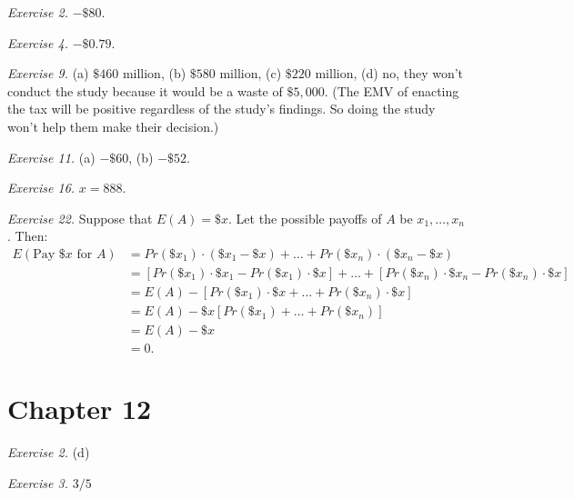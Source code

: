 \documentclass[justified]{tufte-book}
\newcommand{\p}{Pr}
\begin{document}
\noindent
\emph{Exercise 2.} \(-\$80\).

\vspace{.5em}

\noindent
\emph{Exercise 4.} \(-\$0.79\).

\vspace{.5em}

\noindent
\emph{Exercise 9.} (a) \(\$460\) million, (b) \(\$580\) million, (c) \(\$220\) million, (d) no, they won't conduct the study because it would be a waste of \(\$5,000\). (The EMV of enacting the tax will be positive regardless of the study's findings. So doing the study won't help them make their decision.)

\vspace{.5em}

\noindent
\emph{Exercise 11.} (a) \(-\$60\), (b) \(-\$52\).

\vspace{.5em}

\noindent
\emph{Exercise 16.} \(x = 888\).

\vspace{.5em}

\noindent
\emph{Exercise 22.} Suppose that \(E(A) = \$x\). Let the possible payoffs of \(A\) be \(x_1, \ldots, x_n\). Then:
\[
  \begin{aligned}
    E(\text{Pay $\$x$ for $A$})
      &= \p(\$x_1) \cdot (\$x_1 - \$x) + \ldots + \p(\$x_n) \cdot (\$x_n - \$x)\\
      &= \left[\p(\$x_1) \cdot \$ x_1 - \p(\$x_1) \cdot \$x \right] + \ldots + \left[\p(\$x_n) \cdot \$x_n - \p(\$x_n) \cdot \$x \right]\\
      &= E(A) - \left[\p(\$x_1) \cdot \$ x + \ldots + \p(\$x_n) \cdot \$x \right]\\
      &= E(A) - \$x \left[\p(\$x_1) + \ldots + \p(\$x_n) \right]\\
      &= E(A) - \$x \\
      &= 0.
  \end{aligned}
  \]

\hypertarget{chapter-12}{%
\section*{Chapter 12}\label{chapter-12}}

\noindent
\emph{Exercise 2.} (d)

\vspace{.5em}

\noindent
\emph{Exercise 3.} \(3/5\)
\end{document}
